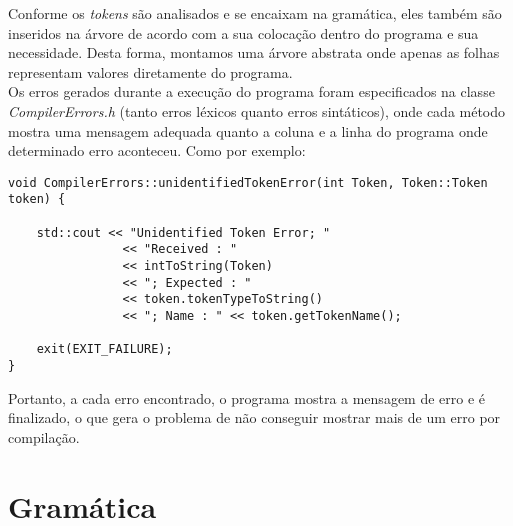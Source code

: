 \documentclass[12pt,a4paper,final]{article}
\begin{document}
Conforme os \textit{tokens} são analisados e se encaixam na gramática, eles também são inseridos na árvore de acordo com a sua colocação dentro do programa e sua necessidade. Desta forma, montamos uma árvore abstrata onde apenas as folhas representam valores diretamente do programa.\\

Os erros gerados durante a execução do programa foram especificados na classe \textit{CompilerErrors.h} (tanto erros léxicos quanto erros sintáticos), onde cada método mostra uma mensagem adequada quanto a coluna e a linha do programa onde determinado erro aconteceu. Como por exemplo:

\begin{lstlisting}
void CompilerErrors::unidentifiedTokenError(int Token, Token::Token token) {

	std::cout << "Unidentified Token Error; "
				<< "Received : "
                << intToString(Token)
                << "; Expected : "
                << token.tokenTypeToString()
                << "; Name : " << token.getTokenName();
                
	exit(EXIT_FAILURE);
}
\end{lstlisting}

Portanto, a cada erro encontrado, o programa mostra a mensagem de erro e é finalizado, o que gera o problema de não conseguir mostrar mais de um erro por compilação.

\section*{Gramática}
\end{document}
